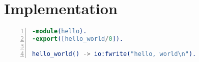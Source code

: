 
\chapter{Implementation}
\label{ch:implementation}

\begin{lstlisting}[language=erlang, frame=single, breaklines=true, numbers=left, caption={Hello World Program in Erlang.}]
-module(hello).
-export([hello_world/0]).

hello_world() -> io:fwrite("hello, world\n").
\end{lstlisting}


